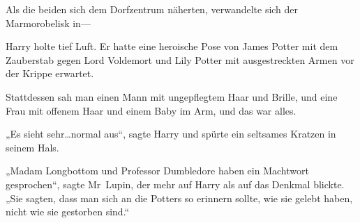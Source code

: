 Als die beiden sich dem Dorfzentrum näherten, verwandelte sich der Marmorobelisk in—

Harry holte tief Luft. Er hatte eine heroische Pose von James Potter mit dem Zauberstab gegen Lord Voldemort und Lily Potter mit ausgestreckten Armen vor der Krippe erwartet.

Stattdessen sah man einen Mann mit ungepflegtem Haar und Brille, und eine Frau mit offenem Haar und einem Baby im Arm, und das war alles.

„Es sieht sehr…normal aus“, sagte Harry und spürte ein seltsames Kratzen in seinem Hals.

„Madam Longbottom und Professor Dumbledore haben ein Machtwort gesprochen“, sagte Mr~Lupin, der mehr auf Harry als auf das Denkmal blickte. „Sie sagten, dass man sich an die Potters so erinnern sollte, wie sie gelebt haben, nicht wie sie gestorben sind.“

